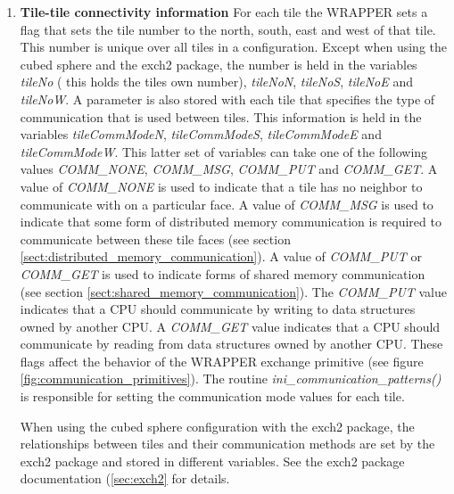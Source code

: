 \begin{enumerate}
\item {\bf Tile-tile connectivity information}
  For each tile the WRAPPER sets a flag that sets the tile number to
  the north, south, east and west of that tile. This number is unique
  over all tiles in a configuration. Except when using the cubed
  sphere and the exch2 package, the number is held in the variables
  {\em tileNo} ( this holds the tiles own number), {\em tileNoN}, {\em
    tileNoS}, {\em tileNoE} and {\em tileNoW}. A parameter is also
  stored with each tile that specifies the type of communication that
  is used between tiles.  This information is held in the variables
  {\em tileCommModeN}, {\em tileCommModeS}, {\em tileCommModeE} and
  {\em tileCommModeW}.  This latter set of variables can take one of
  the following values {\em COMM\_NONE}, {\em COMM\_MSG}, {\em
    COMM\_PUT} and {\em COMM\_GET}.  A value of {\em COMM\_NONE} is
  used to indicate that a tile has no neighbor to communicate with on
  a particular face. A value of {\em COMM\_MSG} is used to indicate
  that some form of distributed memory communication is required to
  communicate between these tile faces (see section
  \ref{sect:distributed_memory_communication}).  A value of {\em
    COMM\_PUT} or {\em COMM\_GET} is used to indicate forms of shared
  memory communication (see section
  \ref{sect:shared_memory_communication}). The {\em COMM\_PUT} value
  indicates that a CPU should communicate by writing to data
  structures owned by another CPU. A {\em COMM\_GET} value indicates
  that a CPU should communicate by reading from data structures owned
  by another CPU. These flags affect the behavior of the WRAPPER
  exchange primitive (see figure \ref{fig:communication_primitives}).
  The routine {\em ini\_communication\_patterns()} is responsible for
  setting the communication mode values for each tile.

  When using the cubed sphere configuration with the exch2 package,
  the relationships between tiles and their communication methods are
  set by the exch2 package and stored in different variables.  See the
  exch2 package documentation (\ref{sec:exch2} for details.

 \\


\end{enumerate}
